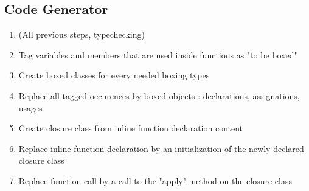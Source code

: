 \subsection{Code Generator}
\begin{enumerate}
\item (All previous steps, typechecking)
\item Tag variables and members that are used inside functions as "to be boxed"
\item Create boxed classes for every needed boxing types
\item Replace all tagged occurences by boxed objects : declarations, assignations, usages
\item Create closure class from inline function declaration content
\item Replace inline function declaration by an initialization of the newly declared closure class
\item Replace function call by a call to the "apply" method on the closure class
\end{enumerate}



